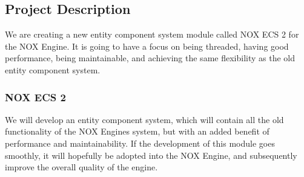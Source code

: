 \subsection{Project Description}
We are creating a new entity component system module called NOX ECS 2 for the NOX Engine. 
It is going to have a focus on being threaded, having good performance, being maintainable, and achieving the same flexibility as the old entity component system.

\subsubsection{NOX ECS 2}
We will develop an entity component system, which will contain all the old functionality of the NOX Engines system, but with an added benefit of performance and maintainability. 
If the development of this module goes smoothly, it will hopefully be adopted into the NOX Engine, and subsequently improve the overall quality of the engine.
